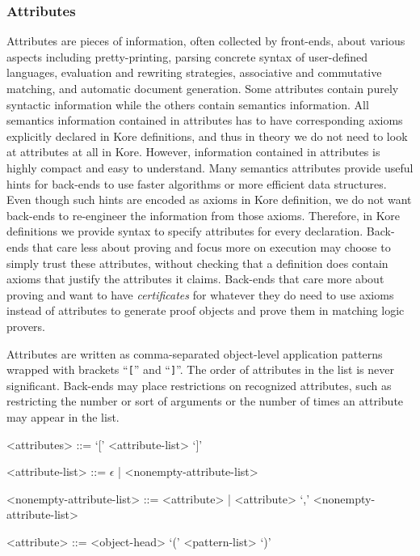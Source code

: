 \documentclass[UTF8,11pt]{article}
\theoremstyle{plain}
\theoremstyle{definition}
\theoremstyle{remark}
\begin{document}
\subsubsection{Attributes}
\label{sec:kore-attributes}

Attributes are pieces of information, often collected by front-ends, about
various aspects including pretty-printing, parsing concrete syntax of
user-defined languages,
evaluation and rewriting strategies,
associative and commutative matching,
and automatic document generation.
Some attributes contain purely syntactic information while the others contain
semantics information.
All semantics information contained in attributes has to have corresponding
axioms explicitly declared in Kore definitions, and thus in theory we do not
need to look at attributes at all in Kore.
However, information contained in attributes is highly compact and easy to
understand.
Many semantics attributes provide useful hints for back-ends to use faster
algorithms or more efficient data structures.
Even though such hints are encoded as axioms in Kore definition, we do not want
back-ends to re-engineer the information from those axioms.
Therefore, in Kore definitions we provide syntax to specify attributes for
every declaration.
Back-ends that care less about proving and focus more on execution may choose
to simply trust these attributes, without checking that a definition does
contain axioms that justify the attributes it claims.
Back-ends that care more about proving and want to have \emph{certificates} for
whatever they do need to use axioms instead of attributes to generate proof
objects and prove them in matching logic provers.

Attributes are written as comma-separated object-level application patterns
wrapped with brackets ``\texttt{[}'' and ``\texttt{]}''.
The order of attributes in the list is never significant.
Back-ends may place restrictions on recognized attributes, such as restricting
the number or sort of arguments or the number of times an attribute may appear
in the list.
\begin{grammar}
<attributes> ::= `[' <attribute-list> `]'

<attribute-list> ::= $\epsilon$ | <nonempty-attribute-list>

<nonempty-attribute-list> ::= <attribute>
| <attribute> `,' <nonempty-attribute-list>

<attribute> ::= <object-head> `(' <pattern-list> `)'
\end{grammar}
\end{document}
